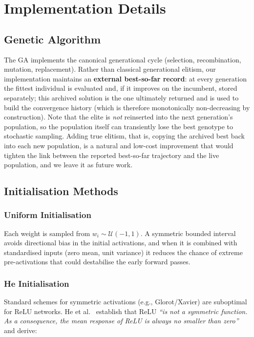 \documentclass[12pt, a4paper]{article}
\begin{document}
\section{Implementation Details}

\subsection{Genetic Algorithm}

The GA implements the canonical generational cycle (selection, recombination, mutation, replacement). Rather than classical generational elitism, our implementation maintains an \textbf{external best-so-far record}: at every generation the fittest individual is evaluated and, if it improves on the incumbent, stored separately; this archived solution is the one ultimately returned and is used to build the convergence history (which is therefore monotonically non-decreasing by construction). Note that the elite is \emph{not} reinserted into the next generation's population, so the population itself can transiently lose the best genotype to stochastic sampling. Adding true elitism, that is, copying the archived best back into each new population, is a natural and low-cost improvement that would tighten the link between the reported best-so-far trajectory and the live population, and we leave it as future work.

\subsection{Initialisation Methods}

\subsubsection{Uniform Initialisation}
Each weight is sampled from $w_i \sim \mathcal{U}(-1,1)$. A symmetric bounded interval avoids directional bias in the initial activations, and when it is combined with standardised inputs (zero mean, unit variance) it reduces the chance of extreme pre-activations that could destabilise the early forward passes.

\subsubsection{He Initialisation}
Standard schemes for symmetric activations (e.g., Glorot/Xavier) are suboptimal for ReLU networks. He et al.\ \cite{he2015} establish that ReLU \textit{``is not a symmetric function. As a consequence, the mean response of ReLU is always no smaller than zero''} and derive:
\end{document}
